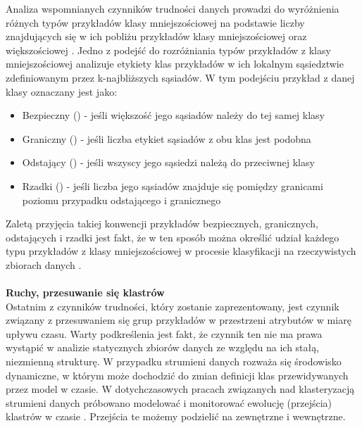 \noindent Analiza wspomnianych czynników trudności danych prowadzi do wyróżnienia różnych typów przykładów klasy mniejszościowej na podstawie liczby znajdujących się w ich pobliżu przykładów klasy mniejszościowej oraz większościowej \cite{Article:DataDistribution3}. Jedno z podejść do rozróżniania typów przykładów z klasy mniejszościowej \cite{Article:DataDistribution3}\cite{Article:DataDistribution2} analizuje etykiety klas przykładów w ich lokalnym sąsiedztwie zdefiniowanym przez k-najbliższych sąsiadów. W tym podejściu przykład z danej klasy oznaczany jest jako:

\begin{itemize}
    \item Bezpieczny () - jeśli większość jego sąsiadów należy do tej samej klasy
    \item Graniczny () - jeśli liczba etykiet sąsiadów z obu klas jest podobna
    \item Odstający () - jeśli wszyscy jego sąsiedzi należą do przeciwnej klasy
    \item Rzadki () - jeśli liczba jego sąsiadów znajduje się pomiędzy granicami poziomu przypadku odstającego i granicznego
\end{itemize}

\noindent Zaletą przyjęcia takiej konwencji przykładów bezpiecznych, granicznych, odstających i rzadki jest fakt, że w ten sposób można określić udział każdego typu przykładów z klasy mniejszościowej w procesie klasyfikacji na rzeczywistych zbiorach danych \cite{Article:TypyPrzykladow}\cite{Article:DataDistribution3}\cite{Article:DataDistribution2}.\\\\
\textbf{Ruchy, przesuwanie się klastrów}\\

\noindent Ostatnim z czynników trudności, który zostanie zaprezentowany, jest czynnik związany z przesuwaniem się grup przykładów w przestrzeni atrybutów w miarę upływu czasu. Warty podkreślenia jest fakt, że czynnik ten nie ma prawa wystąpić w analizie statycznych zbiorów danych ze względu na ich stałą, niezmienną strukturę. W przypadku strumieni danych rozważa się środowisko dynamiczne, w którym może dochodzić do zmian definicji klas przewidywanych przez model w czasie. W dotychczasowych pracach związanych nad klasteryzacją strumieni danych próbowano modelować i monitorować ewolucję (przejścia) klastrów w czasie \cite{Article:ClusterTransition}. Przejścia te możemy podzielić na zewnętrzne i wewnętrzne.

